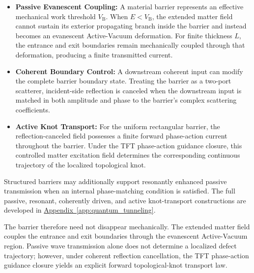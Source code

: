 \begin{itemize}
    \item \textbf{Passive Evanescent Coupling:}
    A material barrier represents an effective mechanical work threshold $V_{\mathrm B}$. When $E<V_{\mathrm B}$, the extended matter field cannot sustain its exterior propagating branch inside the barrier and instead becomes an evanescent Active-Vacuum deformation. For finite thickness $L$, the entrance and exit boundaries remain mechanically coupled through that deformation, producing a finite transmitted current.

    \item \textbf{Coherent Boundary Control:}
    A downstream coherent input can modify the complete barrier boundary state. Treating the barrier as a two-port scatterer, incident-side reflection is canceled when the downstream input is matched in both amplitude and phase to the barrier's complex scattering coefficients.

    \item \textbf{Active Knot Transport:}
    For the uniform rectangular barrier, the reflection-canceled field possesses a finite forward phase-action current throughout the barrier. Under the TFT phase-action guidance closure, this controlled matter excitation field determines the corresponding continuous trajectory of the localized topological knot.
\end{itemize}

Structured barriers may additionally support resonantly enhanced passive transmission when an internal phase-matching condition is satisfied. The full passive, resonant, coherently driven, and active knot-transport constructions are developed in
\hyperref[app:quantum_tunneling]{Appendix~\ref*{app:quantum_tunneling}}.

The barrier therefore need not disappear mechanically. The extended matter field couples the entrance and exit boundaries through the evanescent Active-Vacuum region. Passive wave transmission alone does not determine a localized defect trajectory; however, under coherent reflection cancellation, the TFT phase-action guidance closure yields an explicit forward topological-knot transport law.

